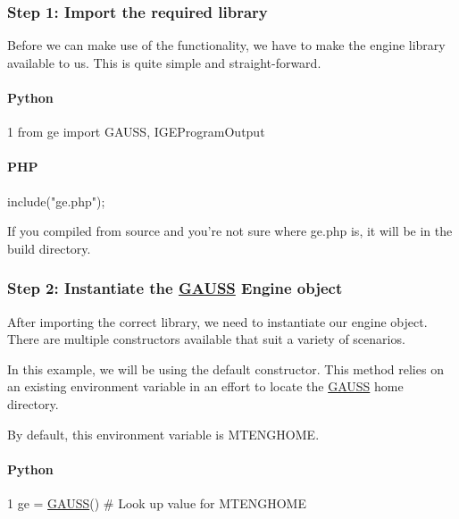 \subsubsection*{Step 1\-: Import the required library}

Before we can make use of the functionality, we have to make the engine library available to us. This is quite simple and straight-\/forward.

\paragraph*{Python}


\begin{DoxyCode}
1 \textcolor{keyword}{from} ge \textcolor{keyword}{import} GAUSS, IGEProgramOutput
\end{DoxyCode}


\paragraph*{P\-H\-P}


\begin{DoxyCode}
include(\textcolor{stringliteral}{"ge.php"});
\end{DoxyCode}


If you compiled from source and you're not sure where {\ttfamily ge.\-php} is, it will be in the {\ttfamily build} directory.

\subsubsection*{Step 2\-: Instantiate the \hyperlink{class_g_a_u_s_s}{G\-A\-U\-S\-S} Engine object}

After importing the correct library, we need to instantiate our engine object. There are multiple constructors available that suit a variety of scenarios.

In this example, we will be using the default constructor. This method relies on an existing environment variable in an effort to locate the \hyperlink{class_g_a_u_s_s}{G\-A\-U\-S\-S} home directory.

By default, this environment variable is {\ttfamily M\-T\-E\-N\-G\-H\-O\-M\-E}.

\paragraph*{Python}


\begin{DoxyCode}
1 ge = \hyperlink{class_g_a_u_s_s}{GAUSS}()  \textcolor{comment}{# Look up value for MTENGHOME}
\end{DoxyCode}
